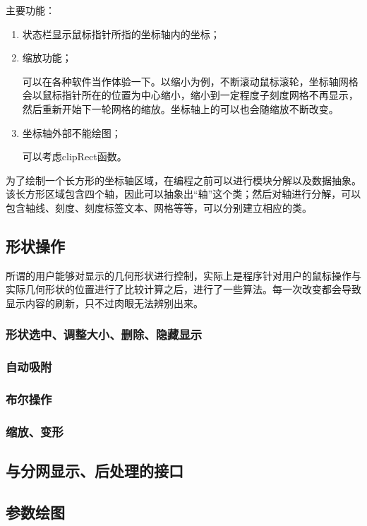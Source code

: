 主要功能：
\begin{enumerate}
	\item 状态栏显示鼠标指针所指的坐标轴内的坐标；
	\item 缩放功能；
	
\hspace*{2em} 可以在各种软件当作体验一下。以缩小为例，不断滚动鼠标滚轮，坐标轴网格会以鼠标指针所在的位置为中心缩小，缩小到一定程度子刻度网格不再显示，然后重新开始下一轮网格的缩放。坐标轴上的可以也会随缩放不断改变。
	\item 坐标轴外部不能绘图；

\hspace*{2em} 可以考虑clipRect函数。
\end{enumerate}

为了绘制一个长方形的坐标轴区域，在编程之前可以进行模块分解以及数据抽象。该长方形区域包含四个轴，因此可以抽象出“轴”这个类；然后对轴进行分解，可以包含轴线、刻度、刻度标签文本、网格等等，可以分别建立相应的类。
\subsection{形状操作}
所谓的用户能够对显示的几何形状进行控制，实际上是程序针对用户的鼠标操作与实际几何形状的位置进行了比较计算之后，进行了一些算法。每一次改变都会导致显示内容的刷新，只不过肉眼无法辨别出来。
\subsubsection{形状选中、调整大小、删除、隐藏显示}

\subsubsection{自动吸附}

\subsubsection{布尔操作}

\subsubsection{缩放、变形}

\subsection{与分网显示、后处理的接口}

\subsection{参数绘图}

